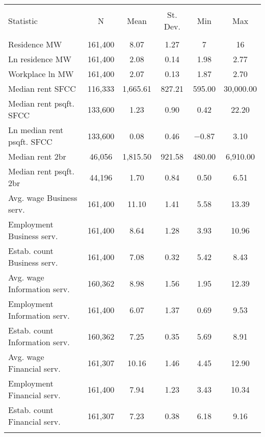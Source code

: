 
\begin{tabular}{@{\extracolsep{5pt}}lccccc} 
\\[-1.8ex]\hline 
\hline \\[-1.8ex] 
Statistic & \multicolumn{1}{c}{N} & \multicolumn{1}{c}{Mean} & \multicolumn{1}{c}{St. Dev.} & \multicolumn{1}{c}{Min} & \multicolumn{1}{c}{Max} \\ 
\hline \\[-1.8ex] 
Residence MW & 161,400 & 8.07 & 1.27 & 7 & 16 \\ 
Ln residence MW & 161,400 & 2.08 & 0.14 & 1.98 & 2.77 \\ 
Workplace ln MW & 161,400 & 2.07 & 0.13 & 1.87 & 2.70 \\ 
Median rent SFCC & 116,333 & 1,665.61 & 827.21 & 595.00 & 30,000.00 \\ 
Median rent psqft. SFCC & 133,600 & 1.23 & 0.90 & 0.42 & 22.20 \\ 
Ln median rent psqft. SFCC & 133,600 & 0.08 & 0.46 & $-$0.87 & 3.10 \\ 
Median rent 2br & 46,056 & 1,815.50 & 921.58 & 480.00 & 6,910.00 \\ 
Median rent psqft. 2br & 44,196 & 1.70 & 0.84 & 0.50 & 6.51 \\ 
Avg. wage Business serv. & 161,400 & 11.10 & 1.41 & 5.58 & 13.39 \\ 
Employment Business serv. & 161,400 & 8.64 & 1.28 & 3.93 & 10.96 \\ 
Estab. count Business serv. & 161,400 & 7.08 & 0.32 & 5.42 & 8.43 \\ 
Avg. wage Information serv. & 160,362 & 8.98 & 1.56 & 1.95 & 12.39 \\ 
Employment Information serv. & 161,400 & 6.07 & 1.37 & 0.69 & 9.53 \\ 
Estab. count Information serv. & 160,362 & 7.25 & 0.35 & 5.69 & 8.91 \\ 
Avg. wage Financial serv. & 161,307 & 10.16 & 1.46 & 4.45 & 12.90 \\ 
Employment Financial serv. & 161,400 & 7.94 & 1.23 & 3.43 & 10.34 \\ 
Estab. count Financial serv. & 161,307 & 7.23 & 0.38 & 6.18 & 9.16 \\ 
\hline \\[-1.8ex] 
\end{tabular} 

